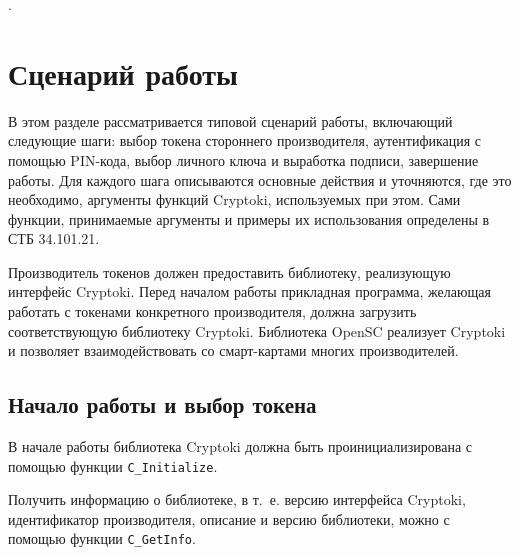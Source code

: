 



.


\section{Сценарий работы}

В этом разделе рассматривается типовой сценарий работы,
включающий следующие шаги: выбор токена стороннего
производителя, аутентификация с помощью PIN-кода, выбор
личного ключа и выработка подписи, завершение работы.
Для каждого шага описываются основные действия и
уточняются, где это необходимо, аргументы функций Cryptoki,
используемых при этом.
Сами функции, принимаемые аргументы и примеры
их использования определены в СТБ 34.101.21.

Производитель токенов должен предоставить библиотеку,
реализующую интерфейс Cryptoki. Перед началом работы прикладная
программа, желающая работать с токенами конкретного
производителя, должна загрузить соответствующую библиотеку
Cryptoki. Библиотека OpenSC реализует Cryptoki и позволяет
взаимодействовать со смарт-картами многих производителей.

\subsection{Начало работы и выбор токена}

В начале работы библиотека Cryptoki должна быть
проинициализирована с помощью функции \verb|C_Initialize|.

Получить информацию о библиотеке, в т.~е. версию интерфейса
Cryptoki, идентификатор производителя, описание и версию
библиотеки, можно с помощью функции \verb|C_GetInfo|.

